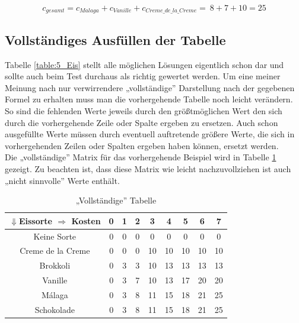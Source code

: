 \documentclass[a4paper, 12pt]{article}
\begin{document}
\begin{equation}
	\label{equation:Wert}
	c_{gesamt} = c_{Malaga} + c_{Vanille} + c_{Creme\_de\_la\_Creme} = \
	8 + 7 + 10 = 25
\end{equation}

\subsection{Vollständiges Ausfüllen der Tabelle}

Tabelle \ref{table:5_Eis} stellt alle möglichen Lösungen eigentlich schon dar und sollte auch beim Test durchaus als richtig gewertet werden. Um eine meiner Meinung nach nur verwirrendere „vollständige” Darstellung nach der gegebenen Formel zu erhalten muss man die vorhergehende Tabelle noch leicht verändern.\\

So sind die fehlenden Werte jeweils durch den größtmöglichen Wert den sich durch die vorhergehende Zeile oder Spalte ergeben zu ersetzen. Auch schon ausgefüllte Werte müssen durch eventuell auftretende größere Werte, die sich in vorhergehenden Zeilen oder Spalten ergeben haben können, ersetzt werden.\\

Die „vollständige” Matrix für das vorhergehende Beispiel wird in Tabelle \ref{table:Vollstaendig} gezeigt. Zu beachten ist, dass diese Matrix wie leicht nachzuvollziehen ist auch „nicht sinnvolle” Werte enthält.

\begin{table}[H]
	\begin{center}
		\begin{tabular}{c|cccccccc}
			$\Downarrow$Eissorte $\Rightarrow$ Kosten & 0 & 1 & 2 & 3 & 4 & 5 &
			6 & 7\\
			\hline
			Keine Sorte			& 0 & 0 & 0 & 0	 &	0 &	 0 & 0 & 0	 \\
			Creme de la Creme	& 0 & 0 & 0 & 10 & 10 & 10 & 10 & 10 \\
			Brokkoli			& 0 & 3 & 3 & 10 & 13 & 13 & 13 & 13 \\
			Vanille				& 0 & 3 & 7 & 10 & 13 & 17 & 20 & 20 \\
			Málaga				& 0 & 3 & 8 & 11 & 15 & 18 & 21 & 25 \\
			Schokolade			& 0 & 3 & 8 & 11 & 15 & 18 & 21 & 25 \\
		\end{tabular}
	\end{center}
\caption{„Vollständige” Tabelle}
\label{table:Vollstaendig}
\end{table}


\titleformat{\section}{\sffamily\bfseries}{}{0pt}{}[{\color{aqua}\hrule}]

\printbibliography
\end{document}
